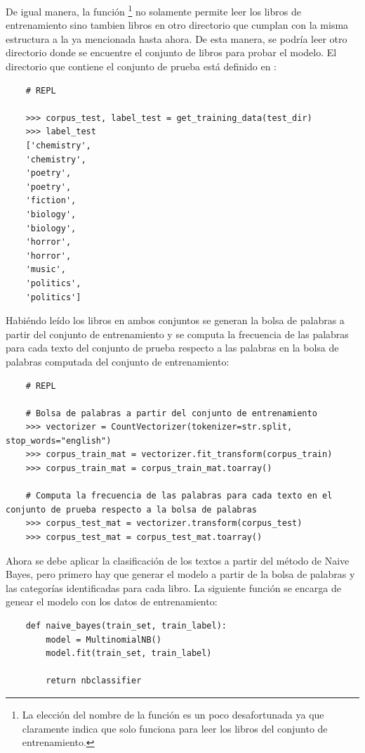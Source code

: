 De igual manera, la función \footnote{La elección del nombre de la función es un poco desafortunada ya que claramente indica que solo funciona para leer los libros del conjunto  de entrenamiento.} no solamente permite leer los libros de entrenamiento sino tambien libros en otro directorio que cumplan con la misma estructura a la ya mencionada hasta ahora. De esta manera, se podría leer otro directorio donde se encuentre el conjunto de libros para probar el modelo. El directorio que contiene el conjunto de prueba está definido en :
\begin{verbatim}
    # REPL

    >>> corpus_test, label_test = get_training_data(test_dir)
    >>> label_test
    ['chemistry',
    'chemistry',
    'poetry',
    'poetry',
    'fiction',
    'biology',
    'biology',
    'horror',
    'horror',
    'music',
    'politics',
    'politics']
\end{verbatim}

Habiéndo leído los libros en ambos conjuntos se generan la bolsa de palabras a partir del conjunto de entrenamiento y se computa la frecuencia de las palabras para cada texto del conjunto de prueba respecto a las palabras en la bolsa de palabras computada del conjunto de entrenamiento:
\begin{verbatim}
    # REPL

    # Bolsa de palabras a partir del conjunto de entrenamiento
    >>> vectorizer = CountVectorizer(tokenizer=str.split, stop_words="english")
    >>> corpus_train_mat = vectorizer.fit_transform(corpus_train)
    >>> corpus_train_mat = corpus_train_mat.toarray()

    # Computa la frecuencia de las palabras para cada texto en el conjunto de prueba respecto a la bolsa de palabras
    >>> corpus_test_mat = vectorizer.transform(corpus_test)
    >>> corpus_test_mat = corpus_test_mat.toarray()
\end{verbatim}

Ahora se debe aplicar la clasificación de los textos a partir del método de Naive Bayes, pero primero hay que generar el modelo a partir de la bolsa de palabras y las categorías identificadas para cada libro. La siguiente función se encarga de genear el modelo con los datos de entrenamiento:
\begin{verbatim}
    def naive_bayes(train_set, train_label):
        model = MultinomialNB()
        model.fit(train_set, train_label)
        
        return nbclassifier
\end{verbatim}

